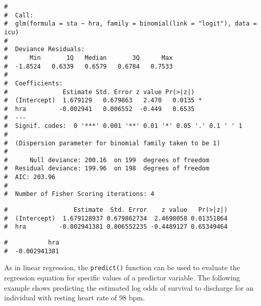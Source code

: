 \documentclass[letterpaper,12pt,twoside,]{pinp}
\begin{document}
\begin{ShadedResult}
\begin{verbatim}
#  
#  Call:
#  glm(formula = sta ~ hra, family = binomial(link = "logit"), data = icu)
#  
#  Deviance Residuals: 
#      Min       1Q   Median       3Q      Max  
#  -1.8524   0.6339   0.6579   0.6784   0.7533  
#  
#  Coefficients:
#               Estimate Std. Error z value Pr(>|z|)  
#  (Intercept)  1.679129   0.679863   2.470   0.0135 *
#  hra         -0.002941   0.006552  -0.449   0.6535  
#  ---
#  Signif. codes:  0 '***' 0.001 '**' 0.01 '*' 0.05 '.' 0.1 ' ' 1
#  
#  (Dispersion parameter for binomial family taken to be 1)
#  
#      Null deviance: 200.16  on 199  degrees of freedom
#  Residual deviance: 199.96  on 198  degrees of freedom
#  AIC: 203.96
#  
#  Number of Fisher Scoring iterations: 4
\end{verbatim}
\end{ShadedResult}

\begin{Shaded}
\begin{Highlighting}[]
\OperatorTok{$}
\end{Highlighting}
\end{Shaded}

\begin{ShadedResult}
\begin{verbatim}
#                  Estimate  Std. Error    z value   Pr(>|z|)
#  (Intercept)  1.679128937 0.679862734  2.4698058 0.01351864
#  hra         -0.002941381 0.006552235 -0.4489127 0.65349464
\end{verbatim}
\end{ShadedResult}

\begin{Shaded}
\begin{Highlighting}[]
\NormalTok{(model.hra)[}\NormalTok{]}
\end{Highlighting}
\end{Shaded}

\begin{ShadedResult}
\begin{verbatim}
#           hra 
#  -0.002941381
\end{verbatim}
\end{ShadedResult}

As in linear regression, the \texttt{predict()} function can be used to
evaluate the regression equation for specific values of a predictor
variable. The following example shows predicting the estimated log odds
of survival to discharge for an individual with resting heart rate of 98
bpm.
\end{document}
